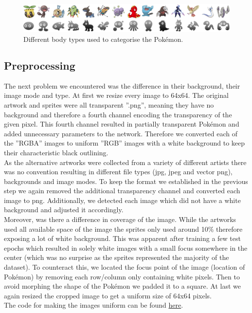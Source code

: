 \documentclass[12pt]{article}
\theoremstyle{plain}
\theoremstyle{definition}
\theoremstyle{remark}
\begin{document}
\begin{figure}[h]
	\centering
	\includegraphics[width=\linewidth]{src/Images/bodyCategorys}
	\caption[Body Categories]{Different body types used to categorise the Pokémon.}
	\label{fig:bodycategorys}
\end{figure}

\subsection{Preprocessing}
The next problem we encountered was the difference in their background, their image mode and
type. At first we resize every image to 64x64. The original artwork and sprites were all transparent ”.png”, meaning they have no background and therefore a fourth channel encoding the transparency of the given pixel. This fourth channel resulted in partially transparent Pokémon and added unnecessary parameters to the network. Therefore we converted each of the ”RGBA”
images to uniform ”RGB” images with a white background to keep their characteristic black outlining. \\
As the alternative artworks were collected from a variety of different artists there was no convention resulting in different file types (jpg, jpeg and vector png), backgrounds and image modes.
To keep the format we established in the previous step we again removed the additional transparency channel and converted each image to png. Additionally, we detected each image which did not have a white background and adjusted it accordingly.\\
 Moreover, was there a difference
in coverage of the image. While the artworks used all available space of the image the sprites only used around 10\% therefore exposing a lot of white background. This was apparent after training a few test epochs which resulted in solely white images with a small focus somewhere in the center (which was no surprise as the sprites represented the majority of the dataset). To counteract this, we located the focus point of the image (location of Pokémon) by removing
each row/column only containing white pixels. Then to avoid morphing the shape of the Pokémon we padded it to a square. At last we again resized the cropped image to get a uniform size of 64x64 pixels.\\
The code for making the images uniform can be found \href{https://github.com/mhueppe/Diffusion_Models/blob/master/preprocessing/preprocessing_uniform_data.py}{here}.
\end{document}
